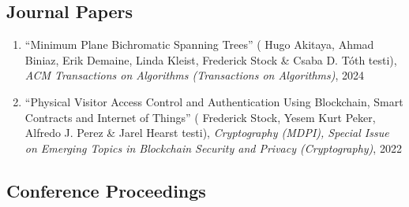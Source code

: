 \documentclass[letterpaper,11pt]{article}
\makeatletter
\newcommand{\resumeSubHeadingListStart}{\begin{itemize}[leftmargin=*]}
\newcommand{\resumeSubHeadingListEnd}{\end{itemize}}
\newcommand{\publication}[6]{
  \item ``#1'' %
   (\ignorespaces#2 testi), %
     \emph{#3}, %
      #4%


}
\newcommand{\pdficon}{\faFilePdf}
\newcommand{\doilabel}{\texttt{DOI}}
\makeatother
\begin{document}
    \subsection*{Journal Papers}%
  
    \begin{enumerate}
    \setcounter{enumi}{\value{pubnum}}
      
        \publication
          {Minimum Plane Bichromatic Spanning Trees}
          {
 Hugo Akitaya, Ahmad Biniaz, Erik Demaine, Linda Kleist, Frederick Stock \& Csaba D. Tóth}
          {ACM Transactions on Algorithms (Transactions on Algorithms)}
          {2024}
          {%
\href{fred-stock.github.io/docstore/MPBST-Transactions.pdf}{\pdficon}%
%
\quad\href{https://doi.org/10.1145/3747591}{\doilabel}%
          }
          {1}
 \vspace{-.5em}  
      
        \publication
          {Physical Visitor Access Control and Authentication Using Blockchain, Smart Contracts and Internet of Things}
          {
 Frederick Stock, Yesem Kurt Peker, Alfredo J. Perez \& Jarel Hearst}
          {Cryptography (MDPI), Special Issue on Emerging Topics in Blockchain Security and Privacy (Cryptography)}
          {2022}
          {%
\href{fred-stock.github.io/docstore/Blockchain-AccessControl-MDPI.pdf}{\pdficon}%
%
\quad\href{https://doi.org/10.3390/cryptography6040065}{\doilabel}%
          }
          {2}
 
    \setcounter{pubnum}{\value{enumi}}
    \end{enumerate}
    \subsection*{Conference Proceedings}%
  
\end{document}
